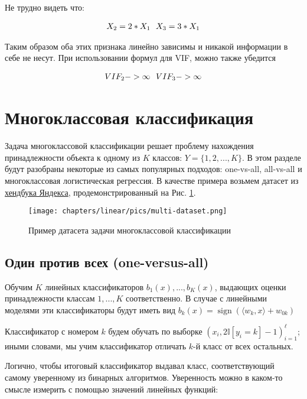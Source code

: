 \begin{itemize}
Не трудно видеть что:

\begin{align}
X_{2} = 2*X_{1} \text{\space\space} X_{3} = 3*X_{1}
\end{align}

Таким образом оба этих признака линейно зависимы и никакой информации в себе не несут. При использовании формул для VIF, можно также убедится

\begin{align}
VIF_{2} -> \infty \text{\space\space} VIF_{3}-> \infty
\end{align}
\section{Многоклассовая классификация}

Задача многоклассовой классификации решает проблему нахождения принадлежности объекта к одному из $K$ классов: $Y = \{1, 2, ..., K\}$. В этом разделе будут разобраны некоторые из самых популярных подходов: one-vs-all, all-vs-all и многоклассовая логистическая регрессия. В качестве примера возьмем датасет из \href{https://education.yandex.ru/handbook/ml/article/linear-models}{хендбука Яндекса}, продемонстрированный на Рис. \ref{fig:linear-multi-dataset}.

\begin{figure}[ht]
	\centering
	\texttt{[image: chapters/linear/pics/multi-dataset.png]}
	\caption{Пример датасета задачи многоклассовой классификации}
	\label{fig:linear-multi-dataset}
\end{figure}

\subsection{Один против всех (one-versus-all)}

Обучим $K$ линейных классификаторов $b_1(x),...,b_K(x)$, выдающих оценки принадлежности классам $1,...,K$ соответственно. В случае с линейными моделями эти классификаторы будут иметь вид $b_k(x) = \operatorname{sign}(\langle w_k, x \rangle+w_{0k})$

Классификатор с номером $k$ будем обучать по выборке $(x_i, 2 \mathbb{I}[y_i = k] -1)^\ell_{i=1} $; иными словами, мы учим классификатор отличать $k$-й класс от всех остальных.

Логично, чтобы итоговый классификатор выдавал класс, соответствующий самому уверенному из бинарных алгоритмов. Уверенность можно в каком-то смысле измерить с помощью значений линейных функций:


\end{itemize}
